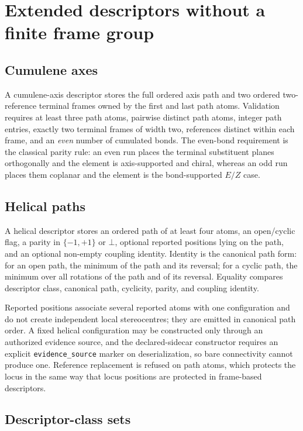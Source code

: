 \documentclass[pdflatex,sn-mathphys-num,referee,lineno]{sn-jnl}
\newcommand{\code}[1]{\texttt{#1}}
\theoremstyle{plain}
\theoremstyle{remark}
\theoremstyle{definition}
\begin{document}
\section{Extended descriptors without a finite frame group}

\subsection{Cumulene axes}

A cumulene-axis descriptor stores the full ordered axis path and two ordered
two-reference terminal frames owned by the first and last path atoms.
Validation requires at least three path atoms, pairwise distinct path atoms,
integer path entries, exactly two terminal frames of width two, references
distinct within each frame, and an \emph{even} number of cumulated bonds.  The
even-bond requirement is the classical parity rule: an even run places the
terminal substituent planes orthogonally and the element is axis-supported and
chiral, whereas an odd run places them coplanar and the element is the
bond-supported \(E/Z\) case.

\subsection{Helical paths}

A helical descriptor stores an ordered path of at least four atoms, an
open/cyclic flag, a parity in \(\{-1,+1\}\) or \(\bot\), optional reported
positions lying on the path, and an optional non-empty coupling identity.
Identity is the canonical path form: for an open path, the minimum of the path
and its reversal; for a cyclic path, the minimum over all rotations of the path
and of its reversal.  Equality compares descriptor class, canonical path,
cyclicity, parity, and coupling identity.

Reported positions associate several reported atoms with one configuration and
do not create independent local stereocentres; they are emitted in canonical
path order.  A fixed helical configuration may be constructed only through an
authorized evidence source, and the declared-sidecar constructor requires an
explicit \code{evidence\_source} marker on deserialization, so bare
connectivity cannot produce one.  Reference replacement is refused on path
atoms, which protects the locus in the same way that locus positions are
protected in frame-based descriptors.

\subsection{Descriptor-class sets}
\label{sec:si-classsets}
\end{document}
